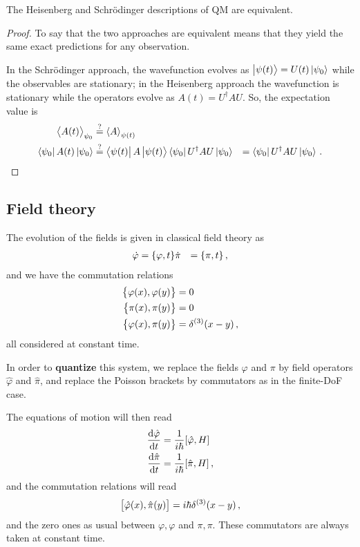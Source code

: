 \documentclass[main.tex]{subfiles}
\begin{document}
\begin{claim}
The Heisenberg and Schrödinger descriptions of QM are equivalent.
\end{claim}

\begin{proof}
To say that the two approaches are equivalent means that they yield the same exact predictions for any observation.

In the Schrödinger approach, the wavefunction evolves as \(\ket{\psi (t)} = U(t) \ket{\psi_0 }\) while the observables are stationary; in the Heisenberg approach the wavefunction is stationary while the operators evolve as \(A(t) = U ^\dag A U\). So, the expectation value is 
%
\begin{align}
\expval{A(t)}_{\psi_0 } &\overset{?}{=} \expval{A}_{\psi (t)}  \\
\bra{\psi_0 } A(t) \ket{\psi_0 } &\overset{?}{=} \bra{\psi (t)} A \ket{\psi (t)} 
\bra{\psi_0 } U ^\dag A U\ket{\psi_0 } &= \bra{\psi_0 } U ^\dag A U \ket{\psi_0 } 
\,.
\end{align}
\end{proof}

\subsection{Field theory}

The evolution of the fields is given in classical field theory as 
%
\begin{align}
\dot{\varphi} &= \qty{\varphi , t}
\dot{\pi} &= \qty{\pi , t}
\,,
\end{align}
%
and we have the commutation relations 
%
\begin{align}
\qty{\varphi (x), \varphi (y)} &=0  \\
\qty{ \pi (x), \pi (y)} &= 0  \\
\qty{\varphi (x), \pi (y)} &= \delta^{(3)}(x-y)
\,,
\end{align}
%
all considered at constant time. 

In order to \textbf{quantize} this system, we replace the fields \(\varphi \) and \(\pi \) by field operators \(\hat{\varphi}\) and \(\hat{\pi}\), and replace the Poisson brackets by commutators as in the finite-DoF case.

The equations of motion will then read 
%
\begin{align}
\dv{\hat{\varphi}}{t} &= \frac{1}{i \hbar} \qty[\hat{\varphi}, H] \\
\dv{\hat{\pi}}{t} &= \frac{1}{i \hbar} \qty[\hat{\pi}, H] 
\,,
\end{align}
%
and the commutation relations will read 
%
\begin{align}
\qty[\hat{\varphi}(x), \hat{\pi }(y)] = i \hbar \delta^{(3)}(x-y)
\,,
\end{align}
%
and the zero ones as usual between \(\varphi, \varphi \) and \(\pi , \pi \).
These commutators are always taken at constant time. 
\end{document}
